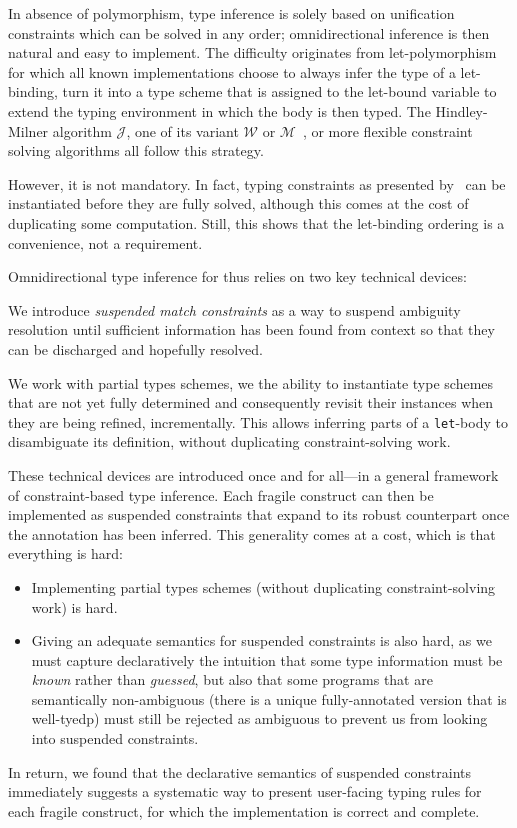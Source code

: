 \documentclass[acmsmall,screen,nonacm]{acmart}
\begin{document}
In absence of polymorphism, type inference is solely based on unification
constraints which can be solved in any order; omnidirectional inference is
then natural and easy to implement.  The difficulty originates from \ML
let-polymorphism for which all known implementations choose to always infer
the type of a let-binding, turn it into a type scheme that is assigned to
the let-bound variable to extend the typing environment in which the body is
then typed. The Hindley-Milner algorithm $\mathcal{J}$, one of its variant
$\mathcal{W}$ or $\mathcal{M}$~\cite {Lee_Yi/algoM@toplas1998}, or more
flexible constraint solving algorithms all follow this strategy.

However, it is not mandatory. In fact, typing constraints as presented
by~\citet {Pottier-Remy/emlti} can be instantiated before they are fully
solved, although this comes at the cost of duplicating some computation.
Still, this shows that the let-binding ordering is a convenience, not a
requirement.

Omnidirectional type inference for \ML thus relies on two key technical devices:
\begin{enumerate*}
\item
  We introduce \emph{suspended match constraints} as a way to suspend
  ambiguity resolution until sufficient information has been found from
  context so that they can be discharged and hopefully resolved.
\item
  We work with partial types schemes, \ie we the ability to instantiate type
  schemes that are not yet fully determined and consequently revisit their
  instances when they are being refined, incrementally. This allows
  inferring parts of a \texttt{let}-body to disambiguate its definition,
  without duplicating constraint-solving work.
\end{enumerate*}

These technical devices are introduced once and for all---in a general
framework of constraint-based type inference. Each fragile \ML construct can
then be implemented as suspended constraints that expand to its robust
counterpart once the annotation has been inferred. This generality comes at
a cost, which is that everything is hard:
\begin{itemize}
\item Implementing partial types schemes (without duplicating
  constraint-solving work) is hard.
\item Giving an adequate semantics for suspended constraints is also hard, as we
  must capture declaratively the intuition that some type information must be
  \emph{known} rather than \emph{guessed}, but also that some programs
  that are semantically non-ambiguous (there is a unique fully-annotated
  version that is well-tyedp) must still be rejected as ambiguous to prevent
  us from looking into suspended constraints. 
\end{itemize}
In return, we found that the declarative semantics of suspended constraints
immediately suggests a systematic way to present user-facing typing rules
for each fragile construct, for which the implementation is correct and
complete.
\end{document}
